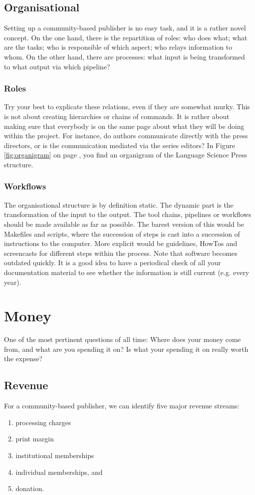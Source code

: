 \documentclass[guidelines,nonflat,modfonts] {langsci/langscibook}
\begin{document}
\subsection{Organisational}
Setting up a community-based publisher is no easy task, and it is a rather novel concept. On the one hand, there is the repartition of roles: who does what; what are the tasks; who is responsible of which aspect; who relays information to whom. On the other hand, there are processes: what input is being transformed to what output via which pipeline?

\subsubsection{Roles}

Try your best to explicate these relations, even if they are somewhat murky. This is not about creating hierarchies or chains of commands. It is rather about making sure that everybody is on the same page about what they will be doing within the project. For instance, do authors communicate directly with the press directors, or is the communication mediated via the series editors? In Figure \ref{fig:organigram} on page \pageref{fig:organigram}, you find an organigram of the Language Science Press structure. 


\subsubsection{Workflows}
The organisational structure is by definition static. The dynamic part is the transformation of the input to the output. The tool chains, pipelines or workflows should be made available as far as possible. The barest version of this would be Makefiles and scripts, where the succession of steps is cast into a succession of instructions to the computer. More explicit would be guidelines, HowTos and screencasts for different steps within the process. Note that software becomes outdated quickly. It is a good idea to have a periodical check of all your documentation material to see whether the information is still current (e.g. every year). 

\section{Money}\label{sec:money}
One of the most pertinent questions of all time: Where does your money come from, and what are you spending it on? Is what your spending it on really worth the expense? 
\subsection{Revenue}
For a community-based publisher, we can identify five major revenue streams: 
\begin{enumerate}
 \item processing charges
 \item print margin
 \item institutional memberships
 \item individual memberships, and  
 \item donation.
\end{enumerate}
\end{document}
